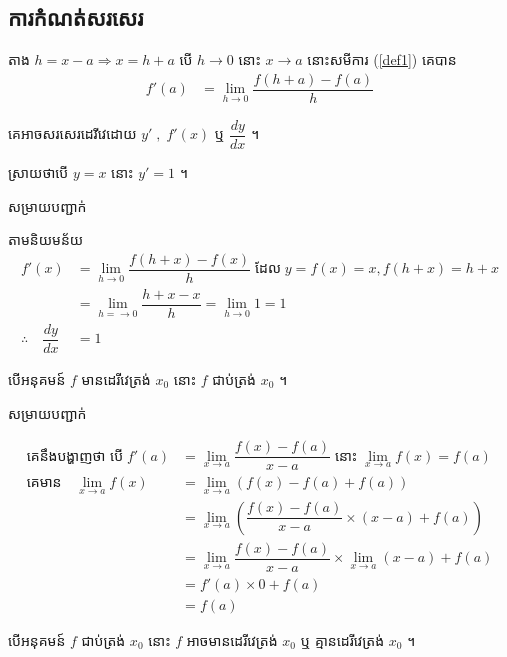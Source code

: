 \documentclass[12pt,fleqn]{book} %
\newcommand{\solution}{{\begin{center}\kml \color{magenta} សម្រាយបញ្ជាក់\end{center} }}
\begin{document}
\subsection{ការកំណត់សរសេរ}
តាង $h=x-a\Longrightarrow x=h+a$ បើ $h\longrightarrow 0$ នោះ $x\longrightarrow a$ នោះសមីការ (\ref{def1}) គេបាន
\begin{align}\label{def2}
f'(a)&=\lim_{h\to 0}\dfrac{f(h+a)-f(a)}{h}
\end{align}
\begin{notation}
គេអាចសរសេរដេរីវេដោយ $y' \;, \; f'(x)$ ឬ $\dfrac{dy}{dx}$ ។ 
\end{notation}
\begin{example}
ស្រាយថាបើ $y=x$ នោះ $y'=1$ ។
\solution 
តាមនិយមន័យ 
\begin{align*}
f'(x)&=\lim_{h\to 0}\dfrac{f(h+x)-f(x)}{h} \;\text {ដែល}\; y=f(x)=x ,f(h+x)=h+x\\
&=\lim_{h=\to 0}\dfrac{h+x-x}{h}=\lim_{h\to 0}1=1\\
\therefore \quad \dfrac{dy}{dx}&=1
\end{align*}
\end{example}
\begin{theorem}
បើអនុគមន៍ $f$ មានដេរីវេត្រង់ $x_0$ នោះ $f$ ជាប់ត្រង់ $x_0$ ។
\end{theorem}
\solution 
\begin{align*}
\text{គេនឹងបង្ហាញថា បើ} \; f'(a)&=\lim_{x\to a}\dfrac{f(x)-f(a)}{x-a} \; \text{នោះ}  \;  \lim_{x\to a}f(x)=f(a) \\
\text{គេមាន} \quad \lim_{x\to a}f(x)&=\lim_{x\to a}\left(f(x)-f(a)+f(a) \right)\\
&=\lim_{x\to a}\left(\dfrac{f(x)-f(a)}{x-a}\times (x-a)+f(a) \right)\\
&=\lim_{x\to a}\dfrac{f(x)-f(a)}{x-a}\times \lim_{x\to a}(x-a)+f(a)\\
&=f'(a)\times 0+f(a)\\
&=f(a)
\end{align*}
\begin{notation}
បើអនុគមន៍ $f$ ជាប់ត្រង់ $x_0$ នោះ $f$ អាចមានដេរីវេត្រង់ $x_0$ ឬ គ្មានដេរីវេត្រង់ $x_0$ ។
\end{notation}
\end{document}
